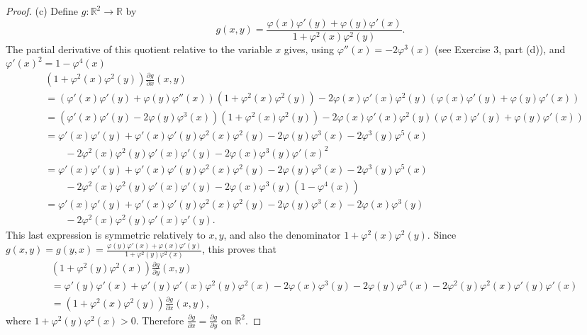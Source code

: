 \documentclass[11pt,a4paper]{article}
\newcommand{\R}{\mathbb{R}}
\begin{document}
\begin{proof}
\item[(c)] Define $g : \R^2 \to \R$ by
$$g(x,y) = \frac{\varphi(x) \varphi'(y) + \varphi(y) \varphi'(x)}{1 + \varphi^2(x) \varphi^2(y)}.$$
The partial derivative of this quotient relative to the variable $x$ gives, using $\varphi''(x) = -2 \varphi^3(x)$ (see Exercise 3, part (d)), and $\varphi'(x)^2 = 1 -\varphi^4(x)$
\begin{align*}
&\left(1 + \varphi^2(x)\varphi^2(y)\right) \frac{\partial g}{\partial x} (x,y) \\
&= \left(\varphi'(x) \varphi'(y) + \varphi(y) \varphi''(x)\right)\left(1+ \varphi^2(x)\varphi^2(y)\right) - 2 \varphi(x) \varphi'(x) \varphi^2(y) \left(\varphi(x) \varphi'(y)+ \varphi(y)\varphi'(x)\right)\\
&= \left(\varphi'(x) \varphi'(y) -2 \varphi(y)\varphi^3(x)\right)\left(1+ \varphi^2(x)\varphi^2(y)\right) - 2 \varphi(x) \varphi'(x) \varphi^2(y) \left(\varphi(x) \varphi'(y)+ \varphi(y)\varphi'(x)\right)\\
&=\varphi'(x) \varphi'(y) + \varphi'(x) \varphi'(y) \varphi^2(x) \varphi^2(y) - 2 \varphi(y) \varphi^3(x) - 2 \varphi^3(y)\varphi^5(x)\\
&  \qquad - 2 \varphi^2(x) \varphi^2(y) \varphi'(x)\varphi'(y) - 2 \varphi(x) \varphi^3(y) \varphi'(x)^2\\
&=\varphi'(x) \varphi'(y) + \varphi'(x) \varphi'(y) \varphi^2(x) \varphi^2(y) - 2 \varphi(y) \varphi^3(x) - 2 \varphi^3(y)\varphi^5(x)\\
&  \qquad - 2 \varphi^2(x) \varphi^2(y) \varphi'(x)\varphi'(y) - 2 \varphi(x) \varphi^3(y) (1 - \varphi^4(x))\\
&=\varphi'(x) \varphi'(y) + \varphi'(x) \varphi'(y) \varphi^2(x) \varphi^2(y) - 2 \varphi(y) \varphi^3(x) -2\varphi(x) \varphi^3(y)\\
&  \qquad - 2 \varphi^2(x) \varphi^2(y) \varphi'(x)\varphi'(y).
\end{align*}
This last expression is symmetric relatively to $x,y$, and also the denominator $1 + \varphi^2(x)\varphi^2(y)$.  Since $g(x,y) = g(y,x) =  \frac{\varphi(y) \varphi'(x) + \varphi(x) \varphi'(y)}{1 + \varphi^2(y) \varphi^2(x)}$, this proves that 
\begin{align*}
&\left(1 + \varphi^2(y)\varphi^2(x)\right) \frac{\partial g}{\partial y} (x,y)\\
&=\varphi'(y) \varphi'(x) + \varphi'(y) \varphi'(x) \varphi^2(y) \varphi^2(x) - 2 \varphi(x) \varphi^3(y) -2\varphi(y) \varphi^3(x)- 2 \varphi^2(y) \varphi^2(x) \varphi'(y)\varphi'(x)\\
&= \left(1 + \varphi^2(x)\varphi^2(y)\right) \frac{\partial g}{\partial x} (x,y),
\end{align*}
where $1 + \varphi^2(y)\varphi^2(x)>0$.
Therefore $\frac{\partial g}{\partial x} = \frac{\partial g}{\partial y}$ on $\R^2$. 


\end{proof}
\end{document}

